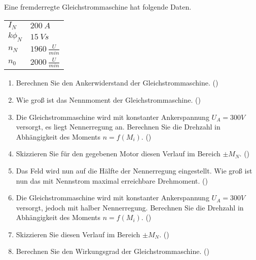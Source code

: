 \begin{question}[topic=gsm,name={18.6.2014},type=exam,tags={20140618}]
Eine fremderregte Gleichstrommaschine hat folgende Daten.\\
\begin{tabular}{L{2cm}l}
$I_{N}$ \dotfill &$200~A$\\
$k \phi_N$ \dotfill & $15~Vs$ \\
$n_N$ \dotfill & $1960~\frac{U}{min}$\\
$n_0$ \dotfill & $2000~\frac{U}{min}$
\end{tabular}
\begin{enumerate}
\item Berechnen Sie den Ankerwiderstand der Gleichstrommaschine. ()
\item Wie groß ist das Nennmoment der Gleichstrommaschine. ()
\item Die Gleichstrommaschine wird mit konstanter Ankerspannung $U_A = 300V$ versorgt, es liegt Nennerregung an. Berechnen Sie die Drehzahl in Abhängigkeit des Moments $n=f(M_i)$. ()
\item Skizzieren Sie für den gegebenen Motor diesen Verlauf im Bereich $\pm M_N$. ()
\item Das Feld wird nun auf die Hälfte der Nennerregung eingestellt. Wie groß ist nun das mit Nennstrom maximal erreichbare Drehmoment. ()
\item Die Gleichstrommaschine wird mit konstanter Ankerspannung $U_A = 300V$ versorgt, jedoch mit halber Nennerregung. Berechnen Sie die Drehzahl in Abhängigkeit des Moments $n=f(M_i)$. ()
\item Skizzieren Sie diesen Verlauf im Bereich $\pm M_N$. ()
\item Berechnen Sie den Wirkungsgrad der Gleichstrommaschine. ()
\end{enumerate}
\end{question}
